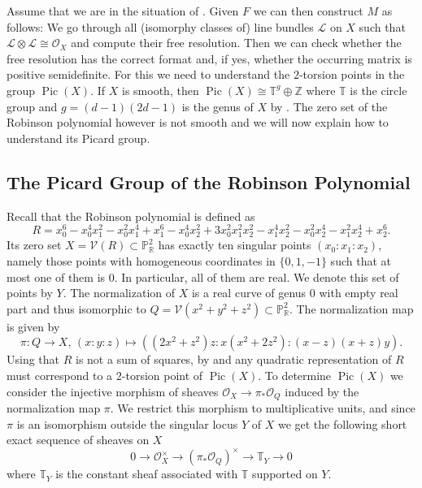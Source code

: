 \documentclass[a4paper,10pt]{amsart}
\theoremstyle{definition}
\theoremstyle{plain}
\newcommand{\Pic}{\operatorname{Pic}}
\newcommand{\cL}{{\mathcal L}}
\newcommand{\cO}{{\mathcal O}}
\newcommand{\cV}{{\mathcal V}}
\newcommand{\R}{{\mathbb R}}
\newcommand{\pp}{\mathbb{P}}
\newcommand{\Z}{{\mathbb Z}}
\begin{document}
Assume that we are in the situation of . Given $F$ we can then construct $M$ as follows: We go through all (isomorphy classes of) line bundles $\cL$ on $X$ such that $\cL\otimes\cL\cong\cO_X$ and compute their free resolution. Then we can check whether the free resolution has the correct format and, if yes, whether the occurring matrix is positive semidefinite. For this we need to understand the $2$-torsion points in the group $\Pic(X)$. If $X$ is smooth, then $\Pic(X)\cong\mathbb{T}^g\oplus\Z$ where $\mathbb{T}$ is the circle group and $g=(d-1)(2d-1)$ is the genus of $X$ by \cite[\S2 and \S4]{grossharris}. The zero set of the Robinson polynomial however is not smooth and we will now explain how to understand its Picard group.


\subsection{The Picard Group of the Robinson Polynomial} \label{sec:Rob}
Recall that the Robinson polynomial is defined as
\begin{equation*}
 R=x_0^6-x_0^4 x_1^2-x_0^2 x_1^4+x_1^6-x_0^4 x_2^2+3 x_0^2 x_1^2 x_2^2-x_1^4 x_2^2-x_0^2 x_2^4-x_1^2 x_2^4+x_2^6.
\end{equation*}
Its zero set $X = \cV(R) \subset\pp_\R^2$ has exactly ten singular points $(x_0:x_1:x_2)$, namely those points with homogeneous coordinates in $\{0,1,-1\}$ such that at most one of them is $0$. In particular, all of them are real. We denote this set of points by $Y$. The normalization of $X$ is a real curve of genus $0$ with empty real part and thus isomorphic to $Q=\cV(x^2+y^2+z^2)\subset\pp_\R^2$. The normalization map is given by
\begin{equation*}
 \pi\colon Q\to X,\, (x:y:z)\mapsto((2x^2+z^2)z:x(x^2+2z^2):(x-z)(x+z)y).
\end{equation*}
Using that $R$ is not a sum of squares, by  and  any quadratic representation of $R$ must correspond to a $2$-torsion point of $\Pic(X)$. To determine $\Pic(X)$ we consider the injective morphism of sheaves $\cO_X \to \pi_* \cO_Q$ induced by the normalization map $\pi$. We restrict this morphism to multiplicative units, and since $\pi$ is an isomorphism outside the singular locus $Y$ of $X$ we get the following short exact sequence of sheaves on $X$
\begin{equation}\label{eq:shortsequence}
 0 \to \cO_X^\times \to (\pi_*\cO_Q)^\times \to \mathbb{T}_Y \to 0
\end{equation}
where $\mathbb{T}_Y$ is the constant sheaf associated with $\mathbb{T}$ supported on $Y$.
\end{document}
